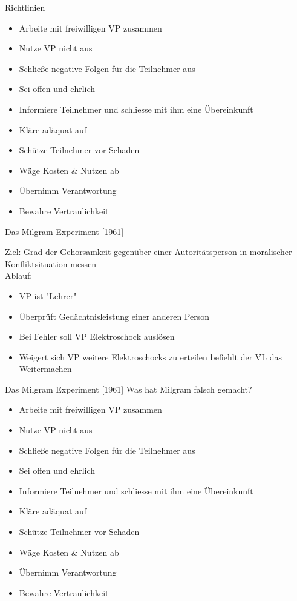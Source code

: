 \documentclass[10pt]{beamer}
\begin{document}
	\begin{frame}{Richtlinien}
		
		\begin{itemize}
			\item Arbeite mit freiwilligen VP zusammen
			\item Nutze VP nicht aus
			\item Schließe negative Folgen für die Teilnehmer aus
			\item Sei offen und ehrlich
			\item Informiere Teilnehmer und schliesse mit ihm eine Übereinkunft
			\item Kläre adäquat auf
			\item Schütze Teilnehmer vor Schaden
			\item Wäge Kosten \& Nutzen ab
			\item Übernimm Verantwortung
			\item Bewahre Vertraulichkeit
		\end{itemize}
		
	\end{frame}
	
	\begin{frame}{Das Milgram Experiment [1961]}
		
		Ziel: Grad der Gehorsamkeit gegenüber einer Autoritätsperson in moralischer Konfliktsituation messen\\
		
		Ablauf:
		\begin{itemize}
			\item VP ist "Lehrer"
			\item Überprüft Gedächtnisleistung einer anderen Person
			\item Bei Fehler soll VP Elektroschock auslösen
			\item Weigert sich VP weitere Elektroschocks zu erteilen befiehlt der VL das Weitermachen
		\end{itemize}
		
	\end{frame}
	
	\begin{frame}{Das Milgram Experiment [1961]}
		Was hat Milgram falsch gemacht?
			\begin{itemize}
				\item Arbeite mit freiwilligen VP zusammen
				\item Nutze VP nicht aus
				\item Schließe negative Folgen für die Teilnehmer aus
				\item Sei offen und ehrlich
				\item Informiere Teilnehmer und schliesse mit ihm eine Übereinkunft
				\item Kläre adäquat auf
				\item Schütze Teilnehmer vor Schaden
				\item Wäge Kosten \& Nutzen ab
				\item Übernimm Verantwortung
				\item Bewahre Vertraulichkeit
			\end{itemize}
	\end{frame}
\end{document}

